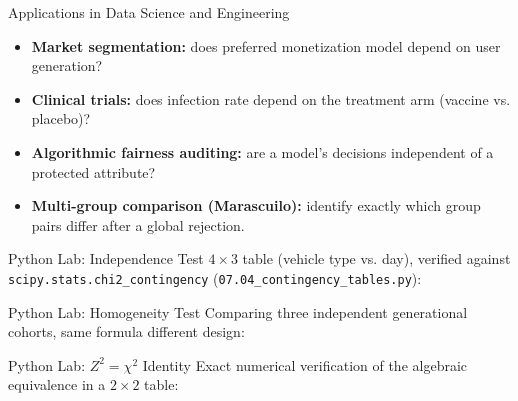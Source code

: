 \documentclass[10pt, aspectratio=169]{beamer}
\begin{document}
\begin{frame}{Applications in Data Science and Engineering}
  \footnotesize
  \begin{itemize}\itemsep=0.1cm
    \item \textbf{Market segmentation:} does preferred monetization model depend on user generation? \pause
    \item \textbf{Clinical trials:} does infection rate depend on the treatment arm (vaccine vs. placebo)? \pause
    \item \textbf{Algorithmic fairness auditing:} are a model's decisions independent of a protected attribute? \pause
    \item \textbf{Multi-group comparison (Marascuilo):} identify exactly which group pairs differ after a global rejection.
  \end{itemize}
\end{frame}

\begin{frame}[fragile]{Python Lab: Independence Test}
  \scriptsize
  $4\times3$ table (vehicle type vs. day), verified against \texttt{scipy.stats.chi2\_contingency} (\texttt{07.04\_contingency\_tables.py}):
  {
  }
\end{frame}

\begin{frame}[fragile]{Python Lab: Homogeneity Test}
  \scriptsize
  Comparing three independent generational cohorts, same formula different design:
  {
  }
\end{frame}

\begin{frame}[fragile]{Python Lab: $Z^2=\chi^2$ Identity}
  \scriptsize
  Exact numerical verification of the algebraic equivalence in a $2\times2$ table:
  {
  }
\end{frame}
\end{document}
